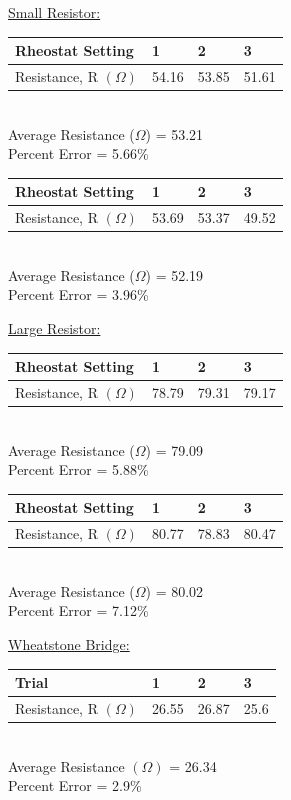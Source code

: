 \documentclass[11pt, titlepage]{article}
\begin{document}
\underline{Small Resistor:}
\begin{center}
\begin{tabular}
{|m{9em}|m{7em}|m{7em}|m{7em}|}
\hline
Rheostat Setting & 1 & 2 & 3 \\
\hline
Resistance, R $(\Omega)$ & 54.16 & 53.85 & 51.61\\
\hline
\end{tabular}
\\Average Resistance ($\Omega$) = 53.21
\\Percent Error = 5.66\%
\end{center}

\begin{center}
\begin{tabular}
{|m{9em}|m{7em}|m{7em}|m{7em}|}
\hline
Rheostat Setting & 1 & 2 & 3 \\
\hline
Resistance, R $(\Omega)$ & 53.69 & 53.37 & 49.52\\
\hline
\end{tabular}
\\Average Resistance ($\Omega$) = 52.19
\\Percent Error = 3.96\%
\end{center}

\underline{Large Resistor:}
\begin{center}
\begin{tabular}
{|m{9em}|m{7em}|m{7em}|m{7em}|}
\hline
Rheostat Setting & 1 & 2 & 3 \\
\hline
Resistance, R $(\Omega)$ & 78.79 & 79.31 & 79.17\\
\hline
\end{tabular}
\\Average Resistance ($\Omega$) = 79.09
\\Percent Error = 5.88\%
\end{center}

\begin{center}
\begin{tabular}
{|m{9em}|m{7em}|m{7em}|m{7em}|}
\hline
Rheostat Setting & 1 & 2 & 3 \\
\hline
Resistance, R $(\Omega)$ & 80.77 & 78.83 & 80.47\\
\hline
\end{tabular}
\\Average Resistance ($\Omega$) = 80.02
\\Percent Error = 7.12\%
\end{center}

\underline{Wheatstone Bridge:}
\begin{center}
\begin{tabular}
{|m{9em}|m{7em}|m{7em}|m{7em}|}
\hline
Trial & 1 & 2 & 3 \\
\hline
Resistance, R $(\Omega)$ & 26.55 & 26.87 & 25.6\\
\hline
\end{tabular}
\\Average Resistance $(\Omega)$ = 26.34
\\Percent Error = 2.9\%
\end{center}
\end{document}
